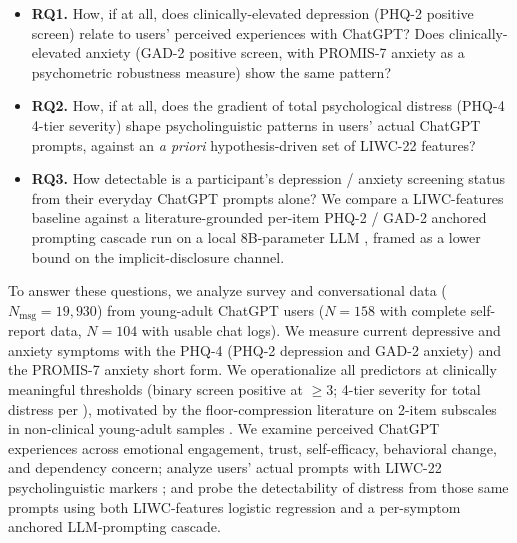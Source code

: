 \documentclass[letterpaper]{article}
\begin{document}
\begin{itemize}
    \item \textbf{RQ1.} How, if at all, does clinically-elevated depression (PHQ-2 positive screen) relate to users' perceived experiences with ChatGPT? Does clinically-elevated anxiety (GAD-2 positive screen, with PROMIS-7 anxiety as a psychometric robustness measure) show the same pattern?

    \item \textbf{RQ2.} How, if at all, does the gradient of total psychological distress (PHQ-4 4-tier severity) shape psycholinguistic patterns in users' actual ChatGPT prompts, against an \emph{a priori} hypothesis-driven set of LIWC-22 features?

    \item \textbf{RQ3.} How detectable is a participant's depression / anxiety screening status from their everyday ChatGPT prompts alone? We compare a LIWC-features baseline against a literature-grounded per-item PHQ-2 / GAD-2 anchored prompting cascade run on a local 8B-parameter LLM \citep{galatzer2025llamadrs,sadeghi2025cognitive}, framed as a lower bound on the implicit-disclosure channel.
\end{itemize}

To answer these questions, we analyze survey and conversational data ($N_{\mathrm{msg}}=19{,}930$) from young-adult ChatGPT users ($N=158$ with complete self-report data, $N=104$ with usable chat logs). We measure current depressive and anxiety symptoms with the PHQ-4 (PHQ-2 depression and GAD-2 anxiety) and the PROMIS-7 anxiety short form. We operationalize all predictors at clinically meaningful thresholds (binary screen positive at $\geq 3$; 4-tier severity for total distress per \citet{lowe2010phq4}), motivated by the floor-compression literature on 2-item subscales in non-clinical young-adult samples \citep{mavrogiorgou2025collabra,khubchandani2024phq4}. We examine perceived ChatGPT experiences across emotional engagement, trust, self-efficacy, behavioral change, and dependency concern; analyze users' actual prompts with LIWC-22 psycholinguistic markers \citep{boyd2022liwc}; and probe the detectability of distress from those same prompts using both LIWC-features logistic regression and a per-symptom anchored LLM-prompting cascade.
\end{document}
